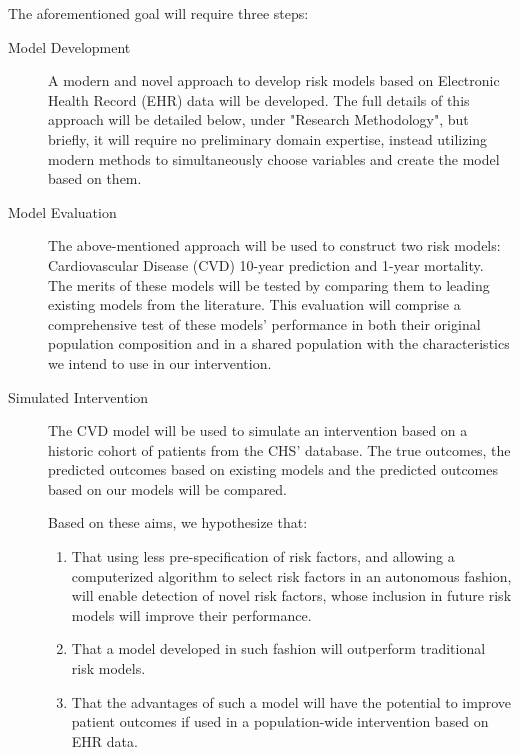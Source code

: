 \documentclass[a4paper,12pt]{article}
\begin{document}
	The aforementioned goal will require three steps:
	\begin{description}
		
		\item[Model Development] A modern and novel approach to develop risk models based on Electronic Health Record (EHR) data will be developed. The full details of this approach will be detailed below, under "Research Methodology", but briefly, it will require no preliminary domain expertise, instead utilizing modern methods to simultaneously choose variables and create the model based on them.
		
		\item[Model Evaluation] The above-mentioned approach will be used to construct two risk models: Cardiovascular Disease (CVD) 10-year prediction and 1-year mortality. The merits of these models will be tested by comparing them to leading existing models from the literature. This evaluation will comprise a comprehensive test of these models' performance in both their original population composition and in a shared population with the characteristics we intend to use in our intervention.
		
		\item[Simulated Intervention] The CVD model will be used to simulate an intervention based on a historic cohort of patients from the CHS' database. The true outcomes, the predicted outcomes based on existing models and the predicted outcomes based on our models will be compared.
		
		Based on these aims, we hypothesize that:
		\begin{enumerate}
			
			\item That using less pre-specification of risk factors, and allowing a computerized algorithm to select risk factors in an autonomous fashion, will enable detection of novel risk factors, whose inclusion in future risk models will improve their performance.
			
			\item That a model developed in such fashion will outperform traditional risk models.
			
			\item That the advantages of such a model will have the potential to improve patient outcomes if used in a population-wide intervention based on EHR data.
			
		\end{enumerate}
		
	\end{description}
	
\end{document}
